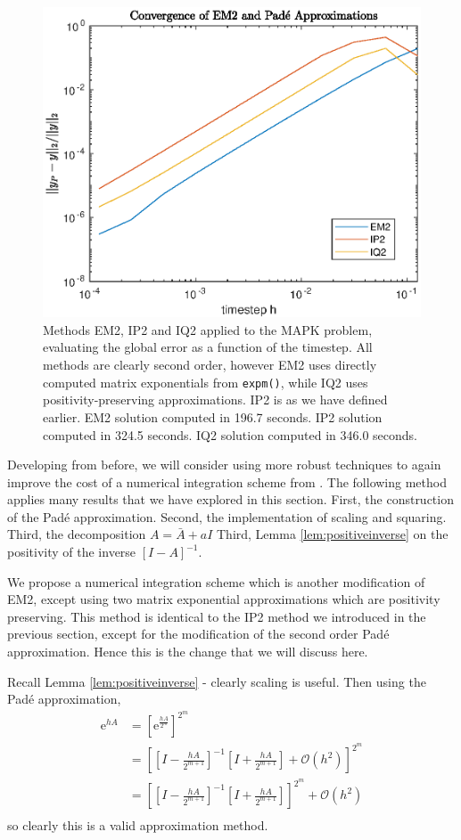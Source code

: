 \begin{figure}
    \centering
    \includegraphics[width=0.75\linewidth]{Matlab/positivemapk2.eps}
    \caption{
        Methods EM2, IP2 and IQ2 applied to the MAPK problem, evaluating the global error as a function of the timestep.
        All methods are clearly second order, however EM2 uses directly computed matrix exponentials from \texttt{expm()},
        while IQ2 uses positivity-preserving approximations.
        IP2 is as we have defined earlier.
        EM2 solution computed in 196.7 seconds.
        IP2 solution computed in 324.5 seconds.
        IQ2 solution computed in 346.0 seconds.
    }
    \label{fig:pademapkpos}
\end{figure}

Developing from before, we will consider using more robust techniques to again improve the cost of a numerical integration scheme from \cite{blanes_pos_2022}.
The following method applies many results that we have explored in this section.
First, the construction of the Pad\'e approximation.
Second, the implementation of scaling and squaring.
Third, the decomposition $A = \bar{A} + a I$
Third, Lemma \ref{lem:positiveinverse} on the positivity of the inverse $[I - A]^{-1}$.

We propose a numerical integration scheme which is another modification of EM2, except using two matrix exponential approximations which are positivity preserving.
This method is identical to the IP2 method we introduced in the previous section, except for the modification of the second order Pad\'e approximation.
Hence this is the change that we will discuss here.

Recall Lemma \ref{lem:positiveinverse} - clearly scaling is useful.
Then using the Pad\'e approximation,
\begin{align*}
    \mathrm{e}^{hA} &= \left[ \mathrm{e}^\frac{hA}{2^m} \right]^{2^m} \\
    &= \left[
        \left[ I - \frac{hA}{2^{m+1}} \right]^{-1} \left[ I + \frac{hA}{2^{m+1}} \right] + \mathcal{O}(h^2)
    \right]^{2^m} \\
    &= \left[
        \left[ I - \frac{hA}{2^{m+1}} \right]^{-1} \left[ I + \frac{hA}{2^{m+1}} \right]
    \right]^{2^m} + \mathcal{O}(h^2) \\
\end{align*} 
so clearly this is a valid approximation method.

